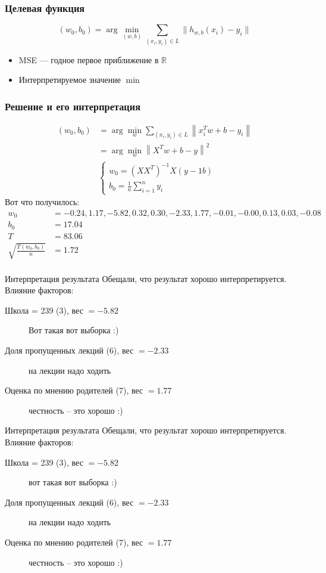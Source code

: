 \documentclass[14pt, fleqn, xcolor={dvipsnames, table}, hyperref={unicode}, babel={english,russian}, inputenc=utf8x]{beamer}
\begin{document}
\begin{frame}[t]\frametitle{Целевая функция}
    $$
      (w_0,b_0) = \arg\min_{(w,b)} \sum_{(x_i,y_i) \in L} \| h_{w,b}(x_i) - y_i \|
    $$
\begin{itemize}
  \item MSE --- годное первое приближение в $\mathbb{R}$
  \item Интерпретируемое значение $\min$
\end{itemize}
\end{frame}

\begin{frame}[t]\frametitle{Решение и его интерпретация}
    $$
      \begin{array}{ll}
      (w_0, b_0) &= \arg\min_w \sum_{(x_i,y_i) \in L} \left\| x_i^Tw + b - y_i \right\| \\
       &= \arg\min_w \left\|X^Tw + b - y\right\|^2 \\
       &\left\{\begin{array}{l}
        w_0 = \left(XX^T\right)^{-1}X(y - 1b) \\
        b_0 = \frac{1}{n} \sum_{i=1}^n y_i
       \end{array}\right.
      \end{array}
    $$
    Вот что получилось:
    {\scriptsize
    $$\begin{array}{ll}
      w_0 &= -0.24, 1.17, -5.82, 0.32, 0.30, -2.33, 1.77, -0.01, -0.00, 0.13, 0.03, -0.08\\
      b_0 &= 17.04 \\
      T&= 83.06 \\
      \sqrt{\frac{T(w_0, b_0)}{n}} &= 1.72\\
    \end{array}
    $$}
\end{frame}

\begin{frame}{Интерпретация результата}
Обещали, что результат хорошо интерпретируется. Влияние факторов:
\footnotesize
\begin{description}
\item[Школа = 239 (3), вес $=-5.82$] Вот такая вот выборка :)
\item[Доля пропущенных лекций (6), вес $=-2.33$] на лекции надо ходить
\item[Оценка по мнению родителей (7), вес $=1.77$] честность -- это хорошо :)
\end{description}
\end{frame}

\begin{frame}{Интерпретация результата}
Обещали, что результат хорошо интерпретируется. Влияние факторов:
\footnotesize
\begin{description}
\item[Школа = 239 (3), вес $=-5.82$] вот такая вот выборка :)
\item[Доля пропущенных лекций (6), вес $=-2.33$] на лекции надо ходить
\item[Оценка по мнению родителей (7), вес $=1.77$] честность -- это хорошо :)
\end{description}
\end{frame}
\end{document}
